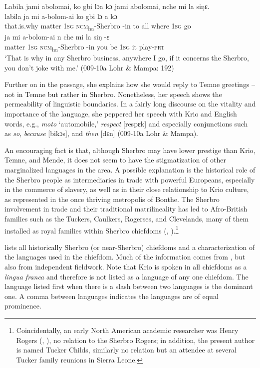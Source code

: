 \ea\label{ex:4}
Labila jami abolomai, ko gbi lɔa kɔ jami abolomai, nche mi la siŋɛ.\\
\gll labila        ja      mi    a-bolom-ai         ko    gbi  lɔ      a    kɔ\\
that.is.why    matter  \textsc{1sg}  \textsc{ncm}\textsubscript{ha}{}-Sherbro  {}-in    to    all    where  \textsc{1sg}  go\\
\gll ja      mi    a-bolom-ai        n    che  mi   la  siŋ  {}-ɛ\\
matter  \textsc{1sg}  \textsc{ncm}\textsubscript{ha}{}-Sherbro  {}-in    you  be    1\textsc{sg}  it  play-\textsc{prt}\\
\glt ‘That is why in any Sherbro business, anywhere I go, if it concerns the Sherbro, you don't joke with me.' (009-10a Lohr \& Mampa: 192)
\z

Further on in the passage, she explains how she would reply to Temne greetings – not in Temne but rather in Sherbro. Nonetheless, her speech shows the permeability of linguistic boundaries. In a fairly long discourse on the vitality and importance of the language, she peppered her speech with Krio and English words, e.g., \textit{moto} ‘automobile,' \textit{respect} [respɛk] and especially conjunctions such as \textit{so}, \textit{because} [bikɔs], and \textit{then} [dɛn] (009-10a Lohr \& Mampa).

An encouraging fact is that, although Sherbro may have lower prestige than Krio, Temne, and Mende, it does not seem to have the stigmatization of other marginalized languages in the area. A possible explanation is the historical role of the Sherbro people as intermediaries in trade with powerful Europeans, especially in the commerce of slavery, as well as in their close relationship to Krio culture, as represented in the once thriving metropolis of Bonthe. The Sherbro involvement in trade and their traditional matrilineality has led to Afro-British families such as the Tuckers, Caulkers, Rogerses, and Clevelands, many of them installed as royal families within Sherbro chiefdoms (\citealt{Caulker-Burnett2010}, \citealt{ReedRobinsonforthcoming}).\footnote{Coincidentally, an early North American academic researcher was Henry Rogers (\citealt{Rogers1967}, \citealt{Rogers1970}), no relation to the Sherbro Rogers; in addition, the present author is named Tucker Childs, similarly no relation but an attendee at several Tucker family reunions in Sierra Leone.}

 lists all historically Sherbro (or near-Sherbro) chiefdoms and a characterization of the languages used in the chiefdom. Much of the information comes from \citet{ReedRobinson2013}, but also from independent fieldwork. Note that Krio is spoken in all chiefdoms as a \textit{lingua franca} and therefore is not listed as a language of any one chiefdom. The language listed first when there is a slash between two languages is the dominant one. A comma between languages indicates the languages are of equal prominence.


